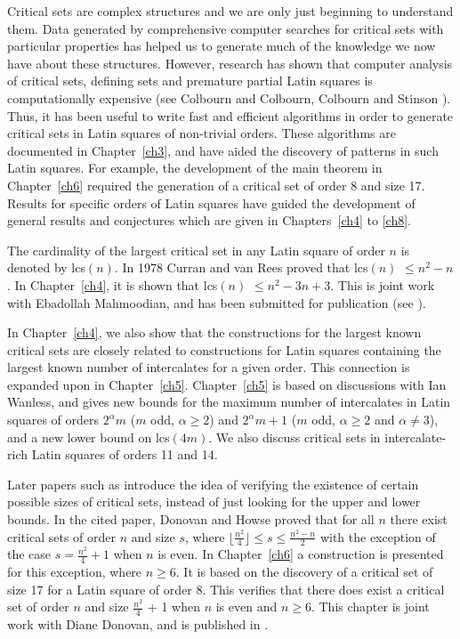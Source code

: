 \documentclass[12pt]{report}
\def\lcs#1{{\rm lcs}$(#1)$}
\begin{document}
Critical sets are complex structures and we are only just beginning
to understand them.  Data generated by comprehensive computer
searches for critical sets with particular properties has helped us
to generate much of the knowledge we now have about these structures.
However, research has shown that computer analysis of critical sets,
defining sets and premature partial Latin squares is computationally
expensive (see Colbourn \cite{MR85d:05055} and Colbourn, Colbourn and
Stinson \cite{MR85k:68035}).  Thus, it has been useful to write fast and
efficient algorithms in order to generate critical sets in Latin squares
of non-trivial orders.  These algorithms are documented in Chapter~\ref{ch3},
and have aided the discovery of patterns in such Latin squares.  For example,
the development of the main theorem in Chapter~\ref{ch6} required the generation of a critical set
of order 8 and size 17.  Results for specific orders of Latin squares
have guided the development of general results and conjectures which
are given in Chapters~\ref{ch4} to \ref{ch8}.
%

The cardinality of the largest critical set in any Latin square of
order $n$ is denoted by \lcs{n}.  In 1978 Curran and van Rees proved
that \lcs{n} $\leq n^2 - n$.  In Chapter~\ref{ch4}, it is shown that \lcs{n}
$\leq n^2-3n+3$.  This is joint work with Ebadollah Mahmoodian, and has
been submitted for publication (see \cite{me3}).

In Chapter~\ref{ch4}, we also show that the constructions for the largest known
critical sets are closely related to constructions
for Latin squares containing the largest known number of intercalates for a
given order.  This connection is expanded upon in Chapter~\ref{ch5}.  Chapter~\ref{ch5}
is based on discussions with Ian Wanless, and gives new bounds for the
maximum number of intercalates in Latin squares of orders $2^\alpha m$
($m$ odd, $\alpha \geq 2$) and $2^\alpha m + 1$ ($m$ odd, $\alpha \geq 2$
and $\alpha \neq 3$), and a new lower bound on \lcs{4m}.
We also discuss critical sets in intercalate-rich
Latin squares of orders 11 and 14.

Later papers such as \cite{MR1758263} introduce the idea of verifying
the existence of certain possible sizes of critical sets, instead
of just looking for the upper and lower bounds.  In the cited paper,
Donovan and Howse proved that for all $n$ there exist critical sets of
order $n$ and size $s$, where $\lfloor \displaystyle{\frac{n^{2}}{4}}
\rfloor \leq s \leq \displaystyle{\frac{n^{2}-n}{2}}$ with the exception
of the case $s = \displaystyle{\frac{n^{2}}{4}} + 1$ when $n$ is even.
In Chapter~\ref{ch6} a construction is presented for this exception, where $n
\geq 6$.  It is based on the discovery of a critical set of size 17
for a Latin square of order 8.  This verifies that there does exist
a critical set of order $n$ and size $\displaystyle{\frac{n^{2}}{4}}$
+ 1 when $n$ is even and $n \geq 6$.  This chapter is joint work with Diane Donovan,
and is published in \cite{me1}.
\end{document}
